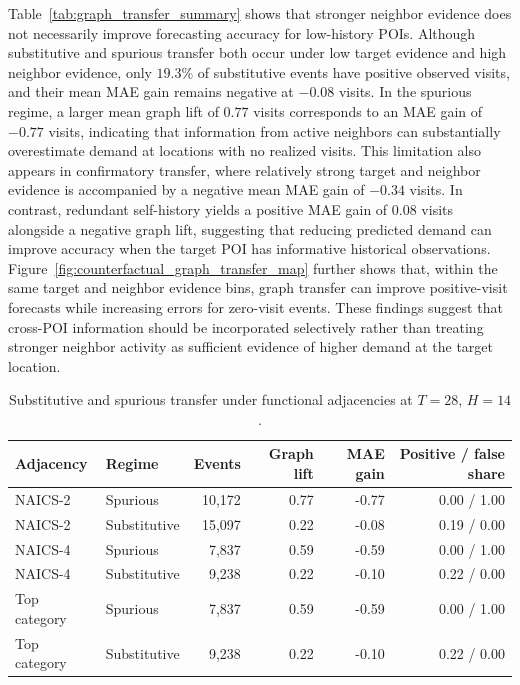 \documentclass[preprint,authoryear,11pt]{elsarticle}
\theoremstyle{definition}
\begin{document}
Table~\ref{tab:graph_transfer_summary} shows that stronger neighbor evidence does not necessarily improve forecasting accuracy for low-history POIs.
Although substitutive and spurious transfer both occur under low target evidence and high neighbor evidence, only \(19.3\%\) of substitutive events have positive observed visits, and their mean MAE gain remains negative at \(-0.08\) visits.
In the spurious regime, a larger mean graph lift of \(0.77\) visits corresponds to an MAE gain of \(-0.77\) visits, indicating that information from active neighbors can substantially overestimate demand at locations with no realized visits.
This limitation also appears in confirmatory transfer, where relatively strong target and neighbor evidence is accompanied by a negative mean MAE gain of \(-0.34\) visits.
In contrast, redundant self-history yields a positive MAE gain of \(0.08\) visits alongside a negative graph lift, suggesting that reducing predicted demand can improve accuracy when the target POI has informative historical observations.
Figure~\ref{fig:counterfactual_graph_transfer_map} further shows that, within the same target and neighbor evidence bins, graph transfer can improve positive-visit forecasts while increasing errors for zero-visit events.
These findings suggest that cross-POI information should be incorporated selectively rather than treating stronger neighbor activity as sufficient evidence of higher demand at the target location.


\begin{table}[!htbp]
\centering
\small
\caption{Substitutive and spurious transfer under functional adjacencies at \(T=28\), \(H=14\).}
\label{tab:semantic_granularity_transfer}
\begin{tabular*}{\linewidth}{@{\extracolsep{\fill}}llrrrr@{}}
\toprule
Adjacency & Regime & Events & Graph lift & MAE gain & Positive / false share \\
\midrule
NAICS-2 & Spurious & 10,172 & 0.77 & -0.77 & 0.00 / 1.00 \\
NAICS-2 & Substitutive & 15,097 & 0.22 & -0.08 & 0.19 / 0.00 \\
NAICS-4 & Spurious & 7,837 & 0.59 & -0.59 & 0.00 / 1.00 \\
NAICS-4 & Substitutive & 9,238 & 0.22 & -0.10 & 0.22 / 0.00 \\
Top category & Spurious & 7,837 & 0.59 & -0.59 & 0.00 / 1.00 \\
Top category & Substitutive & 9,238 & 0.22 & -0.10 & 0.22 / 0.00 \\
\bottomrule
\end{tabular*}
\end{table}
\end{document}
